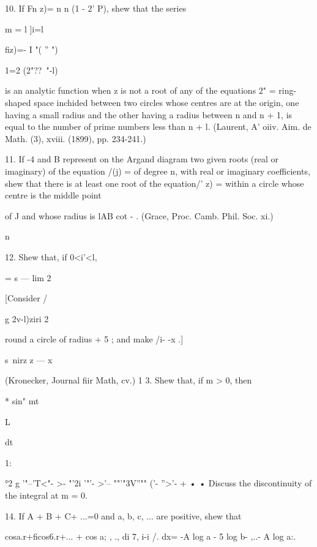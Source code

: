 10. If Fn z)= n n (1 - 2' P), shew that the series

m = l ]i=l

fiz)=- I "( '' ")



1=2 (2"??~"-l)%

is an analytic function when z is not a root of any of the equations
2" = %
ring-shaped space inchided between two circles whose centres are at
the origin, one having a small radius and the other having a radius
between n and n + 1, is equal to the number of prime numbers less than
n + l. (Laurent, A' oiiv. Aim. de Math. (3), xviii. (1899), pp.
234-241.)

11. If -4 and B represent on the Argand diagram two given roots (real
or imaginary) of the equation /(j) = of degree n, with real or
imaginary coefficients, shew that there is at least one root of the
equation/' z) = within a circle whose centre is the middle point

of J and whose radius is lAB cot - . (Grace, Proc. Camb. Phil. Soc.
xi.)

n



12. Shew that, if 0<i'<l,



= s — lim 2



[Consider /



g 2v-l)ziri 2

round a circle of radius + 5 ; and make /i- -x .]



s\ nirz z — x

(Kronecker, Journal fiir Math, cv.) 1 3. Shew that, if m > 0, then

* sin" mt



L



dt



1:



°2 g '"--'T<"- >- "'2i '"'- >'-- ""'"3V''"" ('- ''>'- + • • Discuss
the discontinuity of the integral at m = 0.

14. If A + B + C+ ...=0 and a, b, c, ... are positive, shew that

 cosa.r+ficos6.r+... + cos a; , ., di 7, i-i /. dx= -A log a - 5 log
b- ,..- A log a:.


